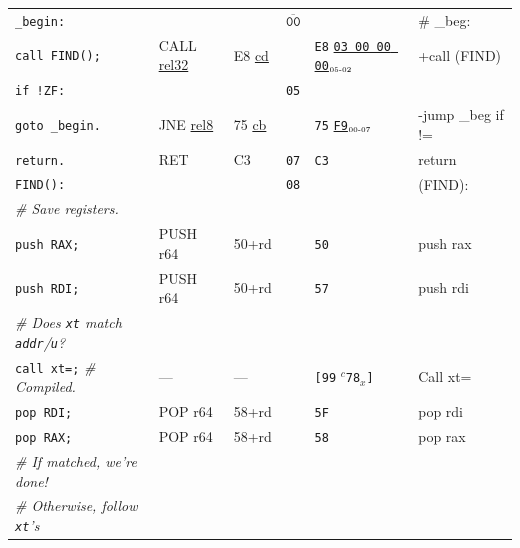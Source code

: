 \documentclass[a4paper,12pt,final]{article}
\begin{document}
\begin{table}[!htbp]
\begin{adjustwidth}{-1cm}{-1cm}
\begin{center}
\begin{tabular}{l|ll|l|lH}
\texttt{\_begin:} &  &  & \(\overline{\texttt{00}}\) &  & \# \_beg:\\[0pt]
\hspace{1.053000em} \texttt{call FIND();} & CALL \uline{rel32} & E8 \uline{cd} &  & \texttt{E8} \uline{\texttt{03 00 00 00}}​\(_{\text{\tiny 05-02}}\) & +call (FIND)\\[0pt]
\hspace{1.053000em} \texttt{if !ZF:} &  &  & \texttt{05} &  & \\[0pt]
\hspace{2.106000em}   \texttt{goto \_begin.} & JNE \uline{rel8} & 75 \uline{cb} &  & \texttt{75} \uline{\texttt{F9}}​\(_{\text{\tiny 00-07}}\) & -jump \_beg if !=\\[0pt]
\hspace{1.053000em} \texttt{return.} & RET & C3 & \texttt{07} & \texttt{C3} & return\\[0pt]
\texttt{FIND():} &  &  & \texttt{08} &  & (FIND):\\[0pt]
\hspace{1.053000em} \emph{\# Save registers.} &  &  &  &  & \\[0pt]
\hspace{1.053000em} \texttt{push RAX;} & PUSH r64 & 50+rd &  & \texttt{50} & push rax\\[0pt]
\hspace{1.053000em} \texttt{push RDI;} & PUSH r64 & 50+rd &  & \texttt{57} & push rdi\\[0pt]
\hspace{1.053000em} \emph{\# Does \texttt{xt} match \texttt{addr}​/​\texttt{u}?} &  &  &  &  & \\[0pt]
\hspace{1.053000em} \texttt{call xt=;}  \emph{\# Compiled.} & --- & --- &  & \texttt{[99} \(^{c}\)​\texttt{78}​\(_{x}\)​\texttt{]} & Call xt=\\[0pt]
\hspace{1.053000em} \texttt{pop RDI;} & POP r64 & 58+rd &  & \texttt{5F} & pop rdi\\[0pt]
\hspace{1.053000em} \texttt{pop RAX;} & POP r64 & 58+rd &  & \texttt{58} & pop rax\\[0pt]
\hspace{1.053000em} \emph{\# If matched, we're done!} &  &  &  &  & \\[0pt]
\hspace{1.053000em} \emph{\# Otherwise, follow \texttt{xt}'s} &  &  &  &  & \\[0pt]

\end{tabular}
\end{center}
\end{adjustwidth}
\end{table}
\end{document}
